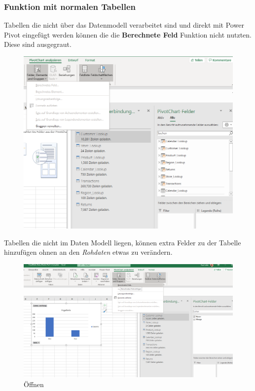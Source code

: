 \subsubsection{Funktion mit normalen Tabellen}
Tabellen die nicht über das Datenmodell verarbeitet sind und direkt mit Power Pivot eingefügt werden können die die \textbf{Berechnete Feld} Funktion nicht nutzten. Diese sind ausgegraut.
\begin{figure}[H]
	\centering
	\includegraphics[scale = 0.3]{attachment/chapter_1/screenshot074}
	\caption{}
	\label{fig:screenshot074}
\end{figure}
Tabellen die nicht im Daten Modell liegen, können extra Felder zu der Tabelle hinzufügen ohnen an den \textit{Rohdaten} etwas zu verändern. 
\begin{figure}[H]
	\centering
	\includegraphics[scale = 0.3]{attachment/chapter_1/screenshot075}
	\caption{Öffnen}
	\label{fig:screenshot075}
\end{figure}
